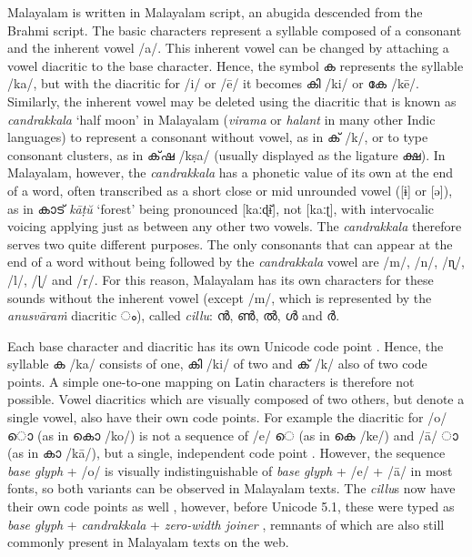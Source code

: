 \documentclass[a4paper]{article}
\newcommand{\ipa}[1]{{\cmuIPA{}#1}}
\begin{document}
Malayalam is written in Malayalam script, an abugida descended from the Brahmi script. The basic characters represent a syllable composed of a consonant and the inherent vowel /a/. This inherent vowel can be changed by attaching a vowel diacritic to the base character. Hence, the symbol ക represents the syllable /ka/, but with the diacritic for /i/ or /ē/ it becomes കി /ki/ or കേ /kē/. Similarly, the inherent vowel may be deleted using the diacritic that is known as \textit{candrakkala} `half moon' in Malayalam (\textit{virama} or \textit{halant} in many other Indic languages) to represent a consonant without vowel, as in ക് /k/, or to type consonant clusters, as in ക്​ഷ /kṣa/ (usually displayed as the ligature ക്ഷ). In Malayalam, however, the \textit{candrakkala} has a phonetic value of its own at the end of a word, often transcribed as a short close or mid unrounded vowel ([\ipa{ɨ}] or [\ipa{ə}]), as in കാട് \textit{kāṭŭ} `forest' being pronounced [\ipa{kaːɖɨ̆}], not [\ipa{kaːʈ}], with intervocalic voicing applying just as between any other two vowels. The \textit{candrakkala} therefore serves two quite different purposes. The only consonants that can appear at the end of a word without being followed by the \textit{candrakkala} vowel are /m/, /n/, /\ipa{ɳ}/, /l/, /\ipa{ɭ}/ and /r/. For this reason, Malayalam has its own characters for these sounds without the inherent vowel (except /m/, which is represented by the \textit{anusvāraṁ} diacritic ം), called \textit{cillu}: ൻ, ൺ, ൽ, ൾ and ർ.

Each base character and diacritic has its own Unicode code point \parencite[p.~334ff]{unicode5}. Hence, the syllable ക /ka/ consists of one, കി /ki/ of two and ക് /k/ also of two code points. A simple one-to-one mapping on Latin characters is therefore not possible. Vowel diacritics which are visually composed of two others, but denote a single vowel, also have their own code points. For example the diacritic for /o/ ൊ (as in കൊ /ko/) is not a sequence of /e/ െ (as in കെ /ke/) and /ā/ ാ (as in കാ /kā/), but a single, independent code point \parencite[p.~334f]{unicode5}. However, the sequence \textit{base glyph} + /o/ is visually indistinguishable of \textit{base glyph} + /e/ + /ā/ in most fonts, so both variants can be observed in Malayalam texts. The \textit{cillu}s now have their own code points as well \parencite{unicode51}, however, before Unicode 5.1, these were typed as \textit{base glyph} + \textit{candrakkala} + \textit{zero-width joiner} \parencite[p.~336f]{unicode5}, remnants of which are also still commonly present in Malayalam texts on the web.
\end{document}
